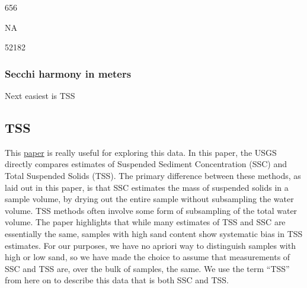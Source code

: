 \documentclass[]{article}
\newenvironment{Shaded}{\begin{snugshade}}{\end{snugshade}}
\newcommand{\CommentTok}[1]{\textcolor[rgb]{0.56,0.35,0.01}{\textit{#1}}}
\newcommand{\DataTypeTok}[1]{\textcolor[rgb]{0.13,0.29,0.53}{#1}}
\newcommand{\KeywordTok}[1]{\textcolor[rgb]{0.13,0.29,0.53}{\textbf{#1}}}
\newcommand{\NormalTok}[1]{#1}
\newcommand{\OperatorTok}[1]{\textcolor[rgb]{0.81,0.36,0.00}{\textbf{#1}}}
\newcommand{\StringTok}[1]{\textcolor[rgb]{0.31,0.60,0.02}{#1}}
\begin{document}
656

NA

52182

\hypertarget{secchi-harmony-in-meters}{%
\subsubsection{Secchi harmony in
meters}\label{secchi-harmony-in-meters}}

\begin{Shaded}
\end{Shaded}

Next easiest is TSS

\hypertarget{tss}{%
\subsection{TSS}\label{tss}}

This \href{https://water.usgs.gov/osw/pubs/WRIR00-4191.pdf}{paper} is
really useful for exploring this data. In this paper, the USGS directly
compares estimates of Suspended Sediment Concentration (SSC) and Total
Suspended Solids (TSS). The primary difference between these methods, as
laid out in this paper, is that SSC estimates the mass of suspended
solids in a sample volume, by drying out the entire sample without
subsampling the water volume. TSS methods often involve some form of
subsampling of the total water volume. The paper highlights that while
many estimates of TSS and SSC are essentially the same, samples with
high sand content show systematic bias in TSS estimates. For our
purposes, we have no apriori way to distinguish samples with high or low
sand, so we have made the choice to assume that measurements of SSC and
TSS are, over the bulk of samples, the same. We use the term ``TSS''
from here on to describe this data that is both SSC and TSS.
\end{document}
